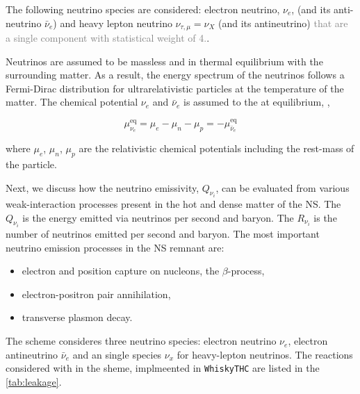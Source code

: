 \documentclass[11pt,a4paper,headinclude=true,DIV=14,BCOR=8mm,chapterprefix,listof=totoc,twoside,openright,abstracton]{scrbook}
\newcommand{\gray}[1]{\textcolor{gray}{#1}}
\begin{document}


The following neutrino species are considered: electron neutrino, $\nu_e$, (and its anti-neutrino $\bar{\nu}_e$) and heavy lepton neutrino $\nu_{\tau,\mu}=\nu_X$ (and its antineutrino) \gray{that are a single component with statistical weight of 4.}.

Neutrinos are assumed to be massless and in thermal equilibrium with the surrounding matter.
As a result, the energy spectrum of the neutrinos follows a Fermi-Dirac distribution for
ultrarelativistic particles at the temperature of the matter. 
The chemical potential $\nu_e$ and $\bar{\nu}_e$ is assumed to the at equilibrium, \cite{Rosswog:2003rv},

\begin{equation}
\mu_{\nu_e}^{\text{eq}} = \mu_e - \mu_n - \mu_p = -\mu_{\bar{\nu}_e}^{\text{eq}}
\end{equation}

where $\mu_e$, $\mu_n$, $\mu_p$ are the relativistic chemical potentials including the rest-mass of the particle. 

Next, we discuss how the neutrino emissivity, $Q_{\nu_{i}}$, can be evaluated from various weak-interaction processes present in the hot and dense matter of the NS. 
The $Q_{\nu_{i}}$ is the energy emitted via neutrinos per second and baryon.
The $R_{\nu_{i}}$ is the number of neutrinos emitted per second and baryon.
The most important neutrino emission processes in the NS remnant are: 
\begin{itemize}
    \item electron and position capture on nucleons, the $\beta$-process,
    \item electron-positron pair annihilation, 
    \item transverse plasmon decay.
\end{itemize}
The scheme consideres three neutrino species: electron neutrino $\nu_e$, electron antineutrino $\bar{\nu}_e$ and an single species $\nu_x$ for heavy-lepton neutrinos.
The reactions considered with in the sheme, implmeented in \texttt{WhiskyTHC} are  listed in the \ref{tab:leakage}.
\end{document}
